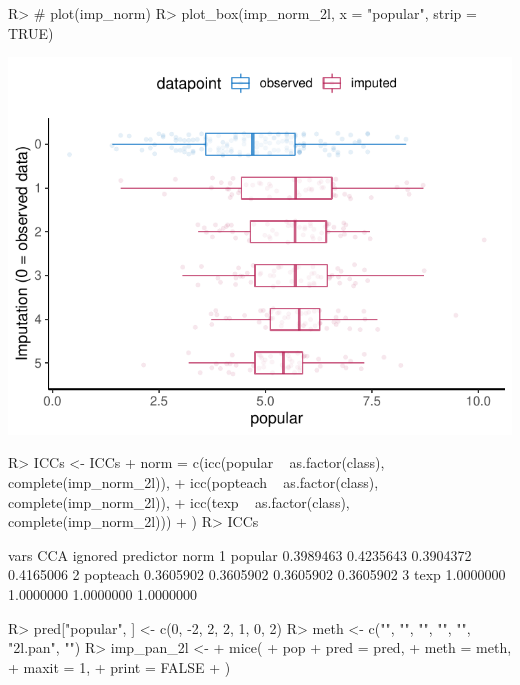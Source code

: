 \documentclass[
]{jss}
\begin{document}
\begin{CodeChunk}
\begin{CodeInput}
R> # plot(imp_norm)
R> plot_box(imp_norm_2l, x = "popular", strip = TRUE)
\end{CodeInput}


\begin{center}\includegraphics{Manuscript_files/figure-latex/pop_norm_eval-1} \end{center}

\begin{CodeInput}
R> ICCs <- ICCs %
+            norm = c(icc(popular ~ as.factor(class), complete(imp_norm_2l)), 
+                     icc(popteach ~ as.factor(class), complete(imp_norm_2l)), 
+                     icc(texp ~ as.factor(class), complete(imp_norm_2l)))
+            )
R> ICCs
\end{CodeInput}
\begin{CodeOutput}
      vars       CCA   ignored predictor      norm
1  popular 0.3989463 0.4235643 0.3904372 0.4165006
2 popteach 0.3605902 0.3605902 0.3605902 0.3605902
3     texp 1.0000000 1.0000000 1.0000000 1.0000000
\end{CodeOutput}
\end{CodeChunk}

\begin{CodeChunk}
\begin{CodeInput}
R> pred["popular", ] <- c(0, -2, 2, 2, 1, 0, 2)
R> meth <- c("", "", "", "", "", "2l.pan", "")
R> imp_pan_2l <-
+   mice(
+     pop %
+     pred = pred,
+     meth = meth,
+     maxit = 1,
+     print = FALSE
+   )
\end{CodeInput}
\end{CodeChunk}
\end{document}
